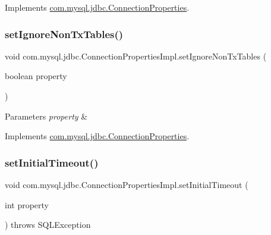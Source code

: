 Implements \mbox{\hyperlink{interfacecom_1_1mysql_1_1jdbc_1_1_connection_properties_a9447a03edd2efdd020960e0a12d22aa7}{com.\+mysql.\+jdbc.\+Connection\+Properties}}.

\mbox{\label{classcom_1_1mysql_1_1jdbc_1_1_connection_properties_impl_a09f67907a067022f4a415a77ea6872b0}} 
\subsubsection{\texorpdfstring{set\+Ignore\+Non\+Tx\+Tables()}{setIgnoreNonTxTables()}}
{\footnotesize\ttfamily void com.\+mysql.\+jdbc.\+Connection\+Properties\+Impl.\+set\+Ignore\+Non\+Tx\+Tables (\begin{DoxyParamCaption}\item[{boolean}]{property }\end{DoxyParamCaption})}


\begin{DoxyParams}{Parameters}
{\em property} & \\
\hline
\end{DoxyParams}


Implements \mbox{\hyperlink{interfacecom_1_1mysql_1_1jdbc_1_1_connection_properties_aef7c4c2447c9875392d6dff3452d9ac2}{com.\+mysql.\+jdbc.\+Connection\+Properties}}.

\mbox{\label{classcom_1_1mysql_1_1jdbc_1_1_connection_properties_impl_afcb603e0165494b6f9a1d0bf6b43e71c}} 
\subsubsection{\texorpdfstring{set\+Initial\+Timeout()}{setInitialTimeout()}}
{\footnotesize\ttfamily void com.\+mysql.\+jdbc.\+Connection\+Properties\+Impl.\+set\+Initial\+Timeout (\begin{DoxyParamCaption}\item[{int}]{property }\end{DoxyParamCaption}) throws S\+Q\+L\+Exception}



